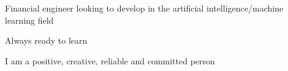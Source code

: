\documentclass[letter,10pt]{article}
\begin{document}

\item Financial engineer looking to develop in the artificial intelligence/machine learning field
\item Always ready to learn
\item I am a positive, creative, reliable and committed person
\end{document}
